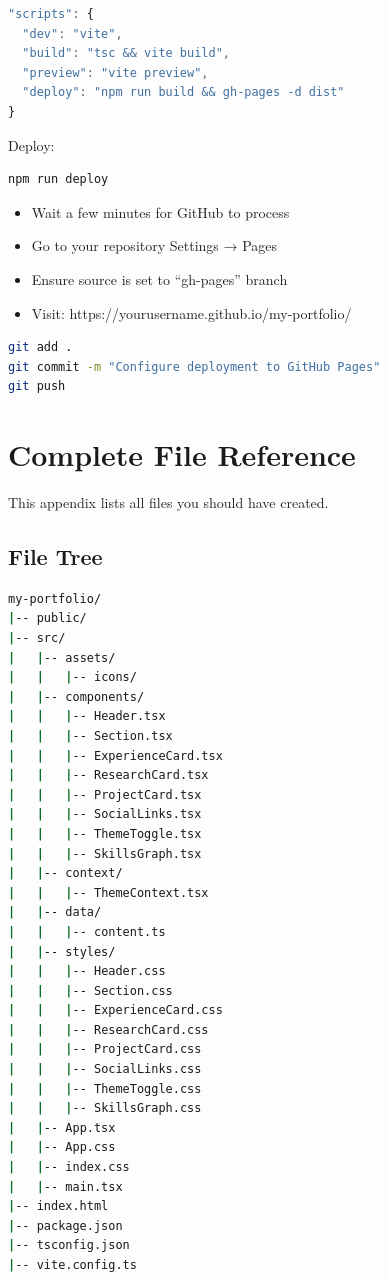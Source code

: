 \documentclass[12pt,a4paper]{article}
\begin{document}
\begin{lstlisting}[language=JavaScript,caption={Add to package.json scripts}]
"scripts": {
  "dev": "vite",
  "build": "tsc && vite build",
  "preview": "vite preview",
  "deploy": "npm run build && gh-pages -d dist"
}
\end{lstlisting}

Deploy:

\begin{lstlisting}[language=bash]
npm run deploy
\end{lstlisting}

\begin{checkpoint}
\begin{itemize}
    \item[$\square$] Wait a few minutes for GitHub to process
    \item[$\square$] Go to your repository Settings → Pages
    \item[$\square$] Ensure source is set to ``gh-pages'' branch
    \item[$\square$] Visit: https://yourusername.github.io/my-portfolio/
\end{itemize}
\end{checkpoint}

\begin{gitcommit}
\begin{lstlisting}[language=bash]
git add .
git commit -m "Configure deployment to GitHub Pages"
git push
\end{lstlisting}
\end{gitcommit}

\appendix

\section{Complete File Reference}

This appendix lists all files you should have created.

\subsection{File Tree}

\begin{lstlisting}[language=bash]
my-portfolio/
|-- public/
|-- src/
|   |-- assets/
|   |   |-- icons/
|   |-- components/
|   |   |-- Header.tsx
|   |   |-- Section.tsx
|   |   |-- ExperienceCard.tsx
|   |   |-- ResearchCard.tsx
|   |   |-- ProjectCard.tsx
|   |   |-- SocialLinks.tsx
|   |   |-- ThemeToggle.tsx
|   |   |-- SkillsGraph.tsx
|   |-- context/
|   |   |-- ThemeContext.tsx
|   |-- data/
|   |   |-- content.ts
|   |-- styles/
|   |   |-- Header.css
|   |   |-- Section.css
|   |   |-- ExperienceCard.css
|   |   |-- ResearchCard.css
|   |   |-- ProjectCard.css
|   |   |-- SocialLinks.css
|   |   |-- ThemeToggle.css
|   |   |-- SkillsGraph.css
|   |-- App.tsx
|   |-- App.css
|   |-- index.css
|   |-- main.tsx
|-- index.html
|-- package.json
|-- tsconfig.json
|-- vite.config.ts
\end{lstlisting}
\end{document}
